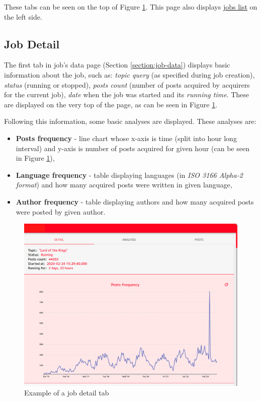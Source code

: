 \documentclass{article}
\begin{document}
These tabs can be seen on the top of Figure \ref{figure:job-detail}. This page also displays \href{section:jobs-list}{jobs list} on the left side.

\subsection{Job Detail}\label{section:job-detail}
The first tab in job's data page (Section \ref{section:job-data}) displays basic information about the job, such as: \textit{topic query} (as specified during job creation), \textit{status} (running or stopped), \textit{posts count} (number of posts acquired by acquirers for the current job), \textit{date} when the job was started and its \textit{running time}. These are displayed on the very top of the page, as can be seen in Figure \ref{figure:job-detail}.

Following this information, some basic analyses are displayed. These analyses are: 
\begin{itemize}
    \item \textbf{Posts frequency} - line chart whose x-axis is time (split into hour long interval) and y-axis is number of posts acquired for given hour (can be seen in Figure \ref{figure:job-detail}),
    \item \textbf{Language frequency} - table displaying languages (in \textit{ISO 3166 Alpha-2 format}) and how many acquired posts were written in given language,
    \item \textbf{Author frequency} - table displaying authors and how many acquired posts were posted by given author.
\end{itemize}

\begin{figure}[h]
\includegraphics[width=\textwidth]{images/job_detail.png}
\centering
\caption{Example of a job detail tab}
\label{figure:job-detail}
\end{figure}
\end{document}
